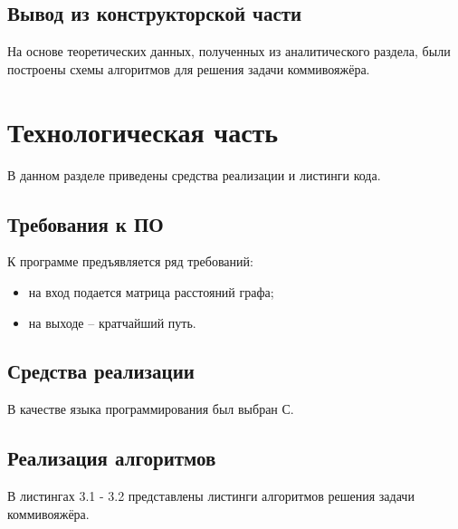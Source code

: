 \documentclass[12pt]{report}
\begin{document}
\section{Вывод из конструкторской части}
	
На основе теоретических данных, полученных из аналитического раздела, были построены схемы алгоритмов для решения задачи коммивояжёра.
	
\chapter{Технологическая часть}
	
В данном разделе приведены средства реализации и листинги кода.
	
\section{Требования к ПО}
	
К программе предъявляется ряд требований:
	
\begin{itemize}
	\item на вход подается матрица расстояний графа;
	\item на выходе -- кратчайший путь.
\end{itemize}
	
\section{Средства реализации}

	В качестве языка программирования был выбран С.
	
\section{Реализация алгоритмов}

В листингах 3.1 - 3.2 представлены листинги алгоритмов решения задачи коммивояжёра.

\newpage
	
\end{document}

